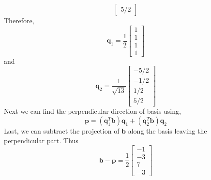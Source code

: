 \begin{mdframed}[style=MyFrame]
\begin{equation}
\begin{bmatrix}
                    5/2
                \end{bmatrix}
    \end{equation}
    Therefore,
        \begin{equation}
            \mathbf{q}_{1} = 
            \frac{1}{2}
            \begin{bmatrix}
                1       \\
                1       \\
                1       \\
                1       
            \end{bmatrix}
        \end{equation}
        and 
        \begin{equation}
            \mathbf{q}_{2} = 
            \frac{1}{\sqrt{13}}
            \begin{bmatrix}
                -5/2    \\
                -1/2    \\
                1/2     \\
                5/2       
            \end{bmatrix}
        \end{equation}
    Next we can find the perpendicular direction of basis using,
        \begin{equation}
            \mathbf{p}  = \left( \mathbf{q}_{1}^{T} \mathbf{b} \right) \mathbf{q}_{1}
                            + \left( \mathbf{q}_{2}^{T} \mathbf{b} \right) \mathbf{q}_{2}
        \end{equation} 
        Last, we can subtract the projection of $\mathbf{b}$ along the basis leaving
        the perpendicular part. Thus
        \begin{equation}
            \mathbf{b} - \mathbf{p} = 
                \frac{1}{2}
                \begin{bmatrix}
                    -1      \\
                    -3      \\
                    7       \\
                    -3
                \end{bmatrix}
        \end{equation}
\end{mdframed}

